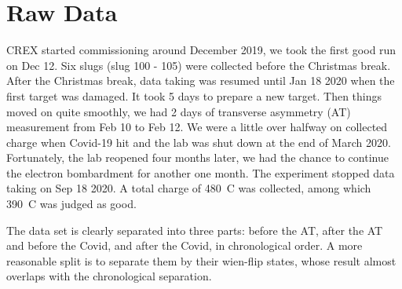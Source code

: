 \begin{comment}
    \begin{itemize}
	\item (design) PREX-II statistical width: $\sim 120\ ppm @30Hz$
	\item (design) BCM resolution: $40\ ppm$
	\item (measured) 1 MHz BCM electronics: $\sim 25\ ppm @30 Hz, 20\ \mu A$
	\item charge and position jitter
	    $$ A_Q: 100-300\ ppm \quad \Delta x: 5-25\ \mu m$$
    \end{itemize}
\end{comment}

\section{Raw Data}
CREX started commissioning around December 2019, we took the first good run on 
Dec 12. Six slugs (slug 100 - 105) were collected before the Christmas break. After 
the Christmas break, data taking was resumed until Jan 18 2020 when the first \Ca 
target was damaged. It took 5 days to prepare a new target.
Then things moved on quite smoothly, we had 2 days of transverse asymmetry (AT)
measurement from Feb 10 to Feb 12. We were a little over halfway on collected charge 
when Covid-19 hit and the lab was shut down at the end of March 2020. Fortunately,
the lab reopened four months later, we had the chance to continue the electron bombardment 
for another one month. The experiment stopped data taking on Sep 18 2020. A total charge
of 480~C was collected, among which 390~C was judged as good. 

The data set is clearly separated into three parts: before the AT, after the AT and before the Covid,
and after the Covid, in chronological order. 
A more reasonable split is to separate them by their wien-flip states, 
whose result almost overlaps with the chronological separation.

